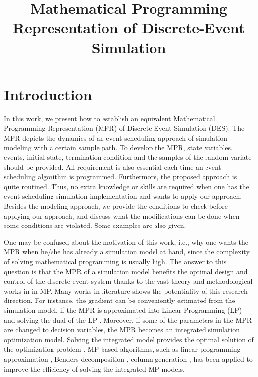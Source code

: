 \documentclass[]{interact}
\theoremstyle{plain}%
\theoremstyle{definition}
\theoremstyle{remark}
\begin{document}

\title{Mathematical Programming Representation of Discrete-Event Simulation}
\maketitle
\begin{abstract}

\end{abstract}

\section{Introduction}

In this work, we present how to establish an equivalent Mathematical Programming Representation (MPR) of Discrete Event Simulation (DES). The MPR depicts the dynamics of an event-scheduling approach of simulation modeling with a certain sample path. To develop the MPR, state variables, events, initial state, termination condition and the samples of the random variate should be provided. All requirement is also essential each time an event-scheduling algorithm is programmed. Furthermore, the proposed approach is quite routined. Thus, no extra knowledge or skills are required when one has the event-scheduling simulation implementation and wants to apply our approach. Besides the modeling approach, we provide the conditions to check before applying our approach, and discuss what the modifications can be done when some conditions are violated. Some examples are also given.

One may be confused about the motivation of this work, i.e., why one wants the MPR when he/she has already a simulation model at hand, since the complexity of solving mathematical programming is usually high. The answer to this question is that the MPR of a simulation model benefits the optimal design and control of the discrete event system thanks to the vast theory and methodological works in in MP. Many works in literature shows the potentiality of this research direction. For instance, the gradient can be conveniently estimated from the simulation model, if the MPR  is approximated into Linear Programming (LP) and solving the dual of the LP \citep{chan2008optimization, zhang2020simulation}. Moreover, if some of the parameters in the MPR are changed to decision variables, the MPR becomes an integrated simulation optimization model. Solving the integrated model provides the optimal solution of the optimization problem \citep{matta2008simulation}. MP-based algorithms, such as linear programming approximation \citep{alfieri2012mathematical}, Benders decomposition \citep{weiss2015buffer}, column generation \citep{alfieri2020time}, has been applied to improve the efficiency of solving the integrated MP models. 
\end{document}
